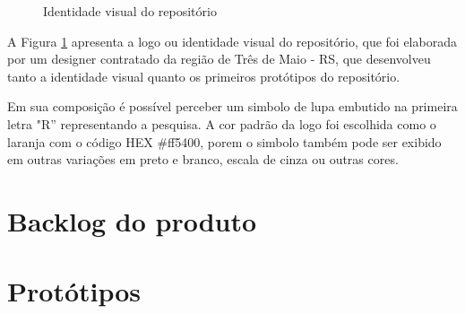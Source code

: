 \begin{figure}[H]
    \caption{Identidade visual do repositório}
    \centering
    \label{fig:resoar}
\end{figure}

A Figura \ref{fig:resoar} apresenta a logo ou identidade visual do repositório,
que foi elaborada por um designer contratado da região de Três de Maio - RS,
que desenvolveu tanto a identidade visual quanto os primeiros protótipos do repositório.

Em sua composição é possível perceber um simbolo de lupa embutido na primeira letra "R''
representando a pesquisa. A cor padrão da logo foi escolhida como o laranja com
o código HEX \#ff5400, porem o simbolo também pode ser exibido em outras variações
em preto e branco, escala de cinza ou outras cores.


\section{Backlog do produto} \label{sec:dev}

\section{Protótipos} \label{sec:exp}



